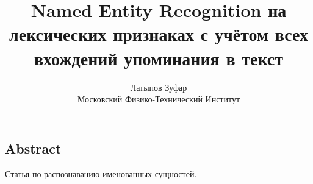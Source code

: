 \documentclass[letterpaper,twocolumn,10pt]{article}
\begin{document}
\date{}

\title{\Large \textbf{Named Entity Recognition на лексических признаках с учётом всех вхождений упоминания в текст} }

\author{
{\rm Латыпов Зуфар}\\
Московский Физико-Технический Институт
}

\maketitle

\thispagestyle{empty}

\subsection*{Abstract}
Статья по распознаванию именованных сущностей.

%
%



{\footnotesize 
}
\end{document}

